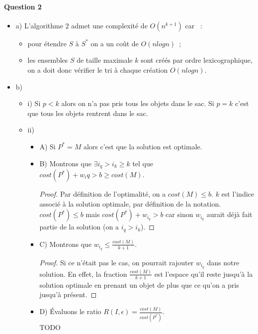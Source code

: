 \paragraph{Question 2}
\begin{itemize}
\item a) L'algorithme $2$ admet une complexité de $O(n^{k+1})$ car ~:
\begin{itemize}
\item pour étendre $S$ à $S^*$ on a un coût de $O(nlogn)$~;
\item les ensembles $S$ de taille maximale $k$ sont créés par ordre lexicographique, on a
doit donc vérifier le tri à chaque création $O(nlogn)$.
\end{itemize}
\item b)
\begin{itemize}
\item i) Si $p < k$ alors on n'a pas pris tous les objets dans le
sac. Si $p = k$ c'est que tous les objets rentrent dans le sac. 
\item ii)
\begin{itemize}
\item A) Si $P^*=M$ alors c'est que la solution est optimale.
\item B) Montrons que $\exists i_q > i_k \geq k$ tel que
$cost(P^*)+w_iq > b \geq cost(M)$.
\begin{proof}
Par définition de l'optimalité, on a $cost(M) \leq b$. $k$ est
l'indice associé à la solution optimale, par définition de la
notation. \\
$cost(P^*) \leq b$ mais $cost(P^*) + w_{i_q} > b$ car sinon $w_{i_q}$
aurait déjà fait partie de la solution (on a $i_q > i_k$). 
\end{proof}
\item C) Montrons que $w_{i_q} \leq \frac{cost(M)}{k+1}$.
\begin{proof}
Si ce n'était pas le cas, on pourrait rajouter $w_{i_q}$ dans
notre solution. En effet, la fraction $\frac{cost(M)}{k+1}$ est
l'espace qu'il reste jusqu'à la solution optimale en prenant un objet
de plus que ce qu'on a pris jusqu'à présent.
\end{proof}
\item D) Évaluons le ratio $R(I, \epsilon)
= \frac{cost(M)}{cost(P^*)}$. \\
TODO
\end{itemize}
\end{itemize}
\end{itemize}
